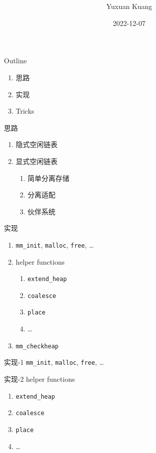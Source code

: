 \documentclass{beamer}
\title{\textbf{\topic}}
\author{Yuxuan Kuang}
\institute{School of EECS, PKU}
\date{2022-12-07}
\begin{document}
{ 
\frame{\titlepage}}

\begin{frame}{Outline}
\begin{enumerate}
	\item 思路
	\item 实现
	\item Tricks
\end{enumerate}
\end{frame}

\begin{frame}{思路}
\begin{enumerate}
	\item 隐式空闲链表
	\item 显式空闲链表
		\begin{enumerate}
			\item 简单分离存储
			\item 分离适配
			\item 伙伴系统
		\end{enumerate}
\end{enumerate}
\end{frame}

\begin{frame}{实现}
\begin{enumerate}
	\item \texttt{mm\_init}, \texttt{malloc}, \texttt{free}, \dots
	\item helper functions
		\begin{enumerate}
			\item \texttt{extend\_heap}
			\item \texttt{coalesce}
			\item \texttt{place}
			\item \dots
		\end{enumerate}
	\item \texttt{mm\_checkheap}
\end{enumerate}
\end{frame}

\begin{frame}{实现-1}
	\texttt{mm\_init}, \texttt{malloc}, \texttt{free}, \dots
\end{frame}

\begin{frame}{实现-2}
	helper functions
	\begin{enumerate}
		\item \texttt{extend\_heap}
		\item \texttt{coalesce}
		\item \texttt{place}
		\item \dots
	\end{enumerate}
\end{frame}
\end{document}
